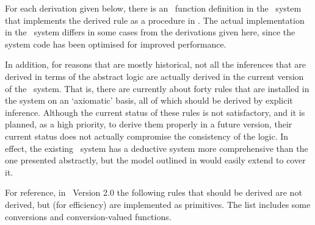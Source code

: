 For each derivation given below, there is an \ML\ function definition
in the \HOL\ system that implements the derived rule as a procedure in
\ML. The actual implementation in the \HOL\ system differs in some
cases from the derivations given here, since the system code has been
optimised for improved performance.

In addition, for reasons that are mostly historical, not all the
inferences that are derived in terms of the abstract logic are
actually derived in the current version of the \HOL\ system.  That is,
there are currently about forty rules that are installed in the system
on an `axiomatic' basis, all of which should be derived by explicit
inference.  Although the current status of these rules is not
satisfactory, and it is planned, as a high priority, to derive them
properly in a future version, their current status does not actually
compromise the consistency of the logic.  In effect, the existing
\HOL\ system has a deductive system more comprehensive than the one
presented abstractly, but the model outlined in \LOGIC{} would easily
extend to cover it.%
%

For reference, in \HOL\ Version 2.0 the following rules that should be
derived
%
%
%
%
are not derived, but (for efficiency) are implemented as
primitives. The list includes some conversions and conversion-valued
functions. %
\vfill \newpage

